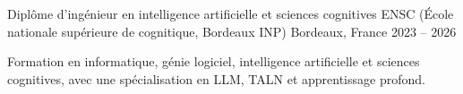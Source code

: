 
\begin{cventries}
  \cventry
    {Diplôme d’ingénieur en intelligence artificielle et sciences cognitives}
    {ENSC (École nationale supérieure de cognitique, Bordeaux INP)}
    {Bordeaux, France}
    {2023 -- 2026}
    {
      \begin{cvitems}
        \item {Formation en informatique, génie logiciel, intelligence artificielle et sciences cognitives, avec une spécialisation en LLM, TALN et apprentissage profond.}
      \end{cvitems}
    }
\end{cventries}
